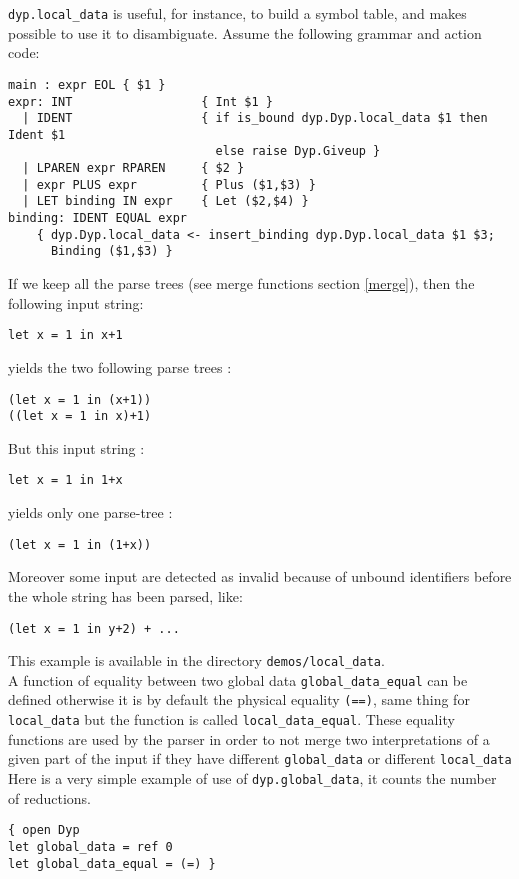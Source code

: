 \documentclass[12pt]{article}
\begin{document}
{\texttt{dyp.local\_data} is useful, for instance, to build a symbol table, and makes possible to use it to disambiguate. Assume the following grammar and action code:
\begin{verbatim}
main : expr EOL { $1 }
expr: INT                  { Int $1 }
  | IDENT                  { if is_bound dyp.Dyp.local_data $1 then Ident $1
                             else raise Dyp.Giveup }
  | LPAREN expr RPAREN     { $2 }
  | expr PLUS expr         { Plus ($1,$3) }
  | LET binding IN expr    { Let ($2,$4) }
binding: IDENT EQUAL expr
    { dyp.Dyp.local_data <- insert_binding dyp.Dyp.local_data $1 $3;
      Binding ($1,$3) }
\end{verbatim}
If we keep all the parse trees (see merge functions section \ref{merge}), then the following input string: \begin{verbatim}
let x = 1 in x+1
\end{verbatim}
yields the two following parse trees :
\begin{verbatim}
(let x = 1 in (x+1))
((let x = 1 in x)+1)
\end{verbatim}
But this input string :
\begin{verbatim}
let x = 1 in 1+x
\end{verbatim}
yields only one parse-tree :
\begin{verbatim}
(let x = 1 in (1+x))
\end{verbatim}
Moreover some input are detected as invalid because of unbound identifiers before the whole string has been parsed, like:
\begin{verbatim}
(let x = 1 in y+2) + ...
\end{verbatim}
This example is available in the directory \texttt{demos/local\_data}.\\

A function of equality between two global data \texttt{global\_data\_equal} can be defined otherwise it is by default the physical equality \texttt{(==)}, same thing for \texttt{local\_data} but the function is called \texttt{local\_data\_equal}. These equality functions are used by the parser in order to not merge two interpretations of a given part of the input if they have different \texttt{global\_data} or different \texttt{local\_data}\\

Here is a very simple example of use of \verb|dyp.global_data|, it counts the number of reductions.
\begin{verbatim}
{ open Dyp
let global_data = ref 0
let global_data_equal = (=) }


\end{verbatim}}
\end{document}
